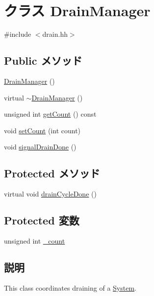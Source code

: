 \hypertarget{classDrainManager}{
\section{クラス DrainManager}
\label{classDrainManager}
}


{\ttfamily \#include $<$drain.hh$>$}\subsection*{Public メソッド}
\begin{DoxyCompactItemize}
\item 
\hyperlink{classDrainManager_a506f93f39ee1dafe8f3c8c2a52750690}{DrainManager} ()
\item 
virtual \hyperlink{classDrainManager_a62f756d150df3c855b036af9c2e16d51}{$\sim$DrainManager} ()
\item 
unsigned int \hyperlink{classDrainManager_ab5eefd157f1a652223437e06c6148169}{getCount} () const 
\item 
void \hyperlink{classDrainManager_a768ed4108d4a470957ab9bffef1f9181}{setCount} (int count)
\item 
void \hyperlink{classDrainManager_ab89d10e368d2e82061eddb9e40022382}{signalDrainDone} ()
\end{DoxyCompactItemize}
\subsection*{Protected メソッド}
\begin{DoxyCompactItemize}
\item 
virtual void \hyperlink{classDrainManager_ac5e51d21241b750913609915d78e7dcc}{drainCycleDone} ()
\end{DoxyCompactItemize}
\subsection*{Protected 変数}
\begin{DoxyCompactItemize}
\item 
unsigned int \hyperlink{classDrainManager_a9f6ec1ea6f54a85f7a9130fb4f468a23}{\_\-count}
\end{DoxyCompactItemize}


\subsection{説明}
This class coordinates draining of a \hyperlink{classSystem}{System}.

